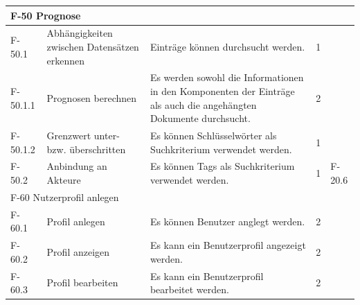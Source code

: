 \begin{tabularx}{\textwidth}{|l|X|X|l|l|}
    \hline
    \multicolumn{5}{|l|}{F-50 Prognose}\\
    \hline
    F-50.1 & Abhängigkeiten zwischen Datensätzen erkennen & Einträge können durchsucht werden. & 1 &\\
    F-50.1.1 & Prognosen berechnen & Es werden sowohl die Informationen in den Komponenten der Einträge als auch die angehängten Dokumente durchsucht. & 2 & \\
    F-50.1.2 & Grenzwert unter- bzw. überschritten & Es können Schlüsselwörter als Suchkriterium verwendet werden. & 1 &\\
    F-50.2 & Anbindung an Akteure & Es können Tags als Suchkriterium verwendet werden. & 1 & F-20.6\\
    \hline
    \multicolumn{5}{|l|}{F-60 Nutzerprofil anlegen}\\
    \hline
    F-60.1 & Profil anlegen & Es können Benutzer anglegt werden. & 2 & \\
    F-60.2 & Profil anzeigen & Es kann ein Benutzerprofil angezeigt werden. & 2 & \\
    F-60.3 & Profil bearbeiten & Es kann ein Benutzerprofil bearbeitet werden. & 2 & \\
    \bottomrule

\end{tabularx}

